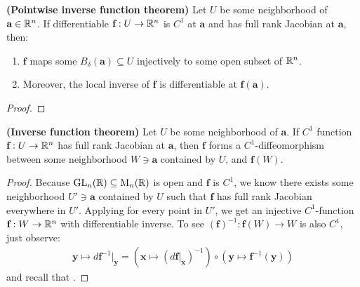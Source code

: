 \documentclass{report}
\begin{document}
\begin{theorem}
\label{THpift}
\textbf{(Pointwise inverse function theorem)} Let $U$ be some neighborhood of  $\textbf{a}\in \mathbb{R}^n$. If differentiable $\textbf{f}:U\rightarrow \mathbb{R}^n$ is $C^1$ at $\textbf{a}$ and has full rank Jacobian at $\textbf{a}$, then: 
\begin{enumerate}[label=(\roman*)]
  \item  $\textbf{f}$ maps some $B_\delta (\textbf{a})\subseteq U$ injectively to some open subset of $\mathbb{R}^n$. 
  \item Moreover, the local inverse of $\textbf{f}$ is differentiable at $\textbf{f}(\textbf{a})$. 
\end{enumerate}
\end{theorem} 
\begin{proof}

\end{proof}
\begin{corollary}
\label{THift}
\textbf{(Inverse function theorem)} Let $U$ be some neighborhood of $\textbf{a}$. If $C^1$ function $\textbf{f}:U\rightarrow \mathbb{R}^n$ has full rank Jacobian at $\textbf{a}$, then $\textbf{f}$ forms a $C^1$-diffeomorphism between some neighborhood  $W\ni \textbf{a}$ contained by $U$, and  $\textbf{f}(W)$.      
\end{corollary}
\begin{proof}
Because $\operatorname{GL}_n(\mathbb{R})\subseteq \operatorname{M}_n(\mathbb{R})$ is open and $\textbf{f}$ is $C^1$, we know there exists some neighborhood $U'\ni \textbf{a}$ contained by $U$ such that  $\textbf{f}$ has full rank Jacobian everywhere in $U'$. Applying  for every point in $U'$, we get an injective  $C^1$-function $\textbf{f}:W \rightarrow \mathbb{R}^n$ with differentiable inverse. To see $(\textbf{f})^{-1}:\textbf{f}(W)\rightarrow W$ is also $C^1$, just observe:  
\begin{align*}
\textbf{y}\mapsto d\textbf{f}^{-1}|_\textbf{y} =   \left(\textbf{x} \mapsto (d\textbf{f}|_\textbf{x})^{-1} \right) \circ  \left(\textbf{y}\mapsto \textbf{f}^{-1}(\textbf{y}) \right)
\end{align*}
and recall that . 
\end{proof}
\end{document}
